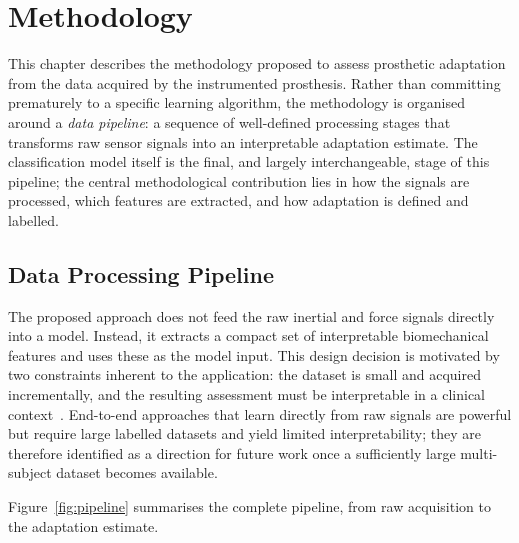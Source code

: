 \chapter{Methodology}
\label{chapter:methodology}

This chapter describes the methodology proposed to assess prosthetic
adaptation from the data acquired by the instrumented prosthesis. Rather than
committing prematurely to a specific learning algorithm, the methodology is
organised around a \emph{data pipeline}: a sequence of well-defined processing
stages that transforms raw sensor signals into an interpretable adaptation
estimate. The classification model itself is the final, and largely
interchangeable, stage of this pipeline; the central methodological
contribution lies in how the signals are processed, which features are
extracted, and how adaptation is defined and labelled.

\section{Data Processing Pipeline}
\label{section:pipeline}

The proposed approach does not feed the raw inertial and force signals directly
into a model. Instead, it extracts a compact set of interpretable biomechanical
features and uses these as the model input. This design decision is motivated by
two constraints inherent to the application: the dataset is small and acquired
incrementally, and the resulting assessment must be interpretable in a clinical
context~\cite{Mannini2016}. End-to-end approaches that learn directly
from raw signals are powerful but require large labelled datasets and yield
limited interpretability; they are therefore identified as a direction for
future work once a sufficiently large multi-subject dataset becomes available.

Figure~\ref{fig:pipeline} summarises the complete pipeline, from raw
acquisition to the adaptation estimate.

